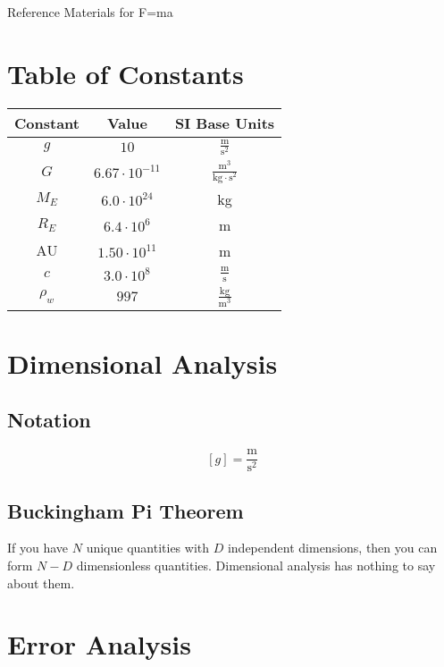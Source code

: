 \documentclass[12pt]{article}
\begin{document}
\begin{center}
    \Large Reference Materials for F=ma
\end{center}

\section{Table of Constants}

\begin{center}
    \begin{tabular}{ ||c|c|c|| } 
        \hline
        \hline
        \textbf{ Constant} & \textbf{Value} & \textbf{SI Base Units} \\ 
        \hline
        \hline
        $g$ & $10$ & $\frac{\text{m}}{\text{s}^2}$ \\ 
        \hline
        $G$ & $6.67 \cdot 10^{-11}$ & $\frac{\text{m}^3}{\text{kg}\cdot\text{s}^2}$\\ 
        \hline
        $M_E$ & $6.0 \cdot 10^{24}$ & kg \\
        \hline
        $R_E$ & $6.4 \cdot 10^{6}$ & m \\
        \hline
        $\text{AU}$ & $1.50 \cdot 10^{11}$ & m\\
        \hline
        $c$ & $3.0 \cdot 10^8$ & $\frac{\text{m}}{\text{s}}$ \\
        \hline
        $\rho_w$ & $997$ & $\frac{\text{kg}}{\text{m}^3}$ \\
        \hline
        \hline
    \end{tabular}
\end{center}


\section{Dimensional Analysis}
\subsection{Notation}

$$
[g] = \frac{\text{m}}{\text{s}^2}
$$

\subsection{Buckingham Pi Theorem}
If you have $N$ unique quantities with $D$ independent dimensions, then you can form $N-D$ dimensionless quantities.
Dimensional analysis has nothing to say about them.


\section{Error Analysis}
\end{document}
